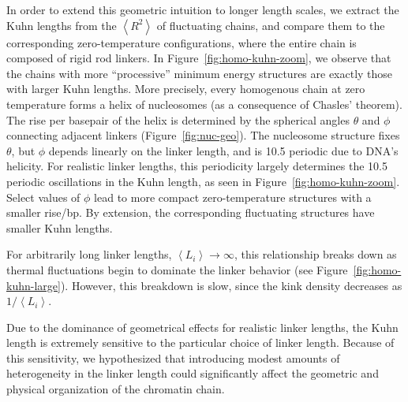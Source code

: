 \documentclass[%
 reprint,
superscriptaddress,
showpacs,preprintnumbers,
 amsmath,amssymb,
 aps,
 prl,
]{revtex4-1}
\newcommand{\RR}{\left\langle{}R^2\right\rangle{}}
\newcommand{\meanli}{\left\langle{}L_i\right\rangle}
\begin{document}
In order to extend this geometric intuition to longer length scales, we extract
the Kuhn lengths from the $\RR$ of fluctuating chains, and compare them to
    the corresponding  zero-temperature configurations, where the entire chain is
    composed of rigid rod linkers.
In Figure~\ref{fig:homo-kuhn-zoom},%
we observe that the chains with more ``processive'' minimum energy structures
    are exactly those with larger Kuhn lengths.
More precisely, every homogenous chain at zero temperature forms a
    helix of nucleosomes (as a consequence of Chasles' theorem).
The rise per basepair of the helix is determined by the spherical angles
    $\theta$ and $\phi$ connecting adjacent linkers (Figure~\ref{fig:nuc-geo}).
The nucleosome structure fixes $\theta$, but $\phi$ depends linearly on the
    linker length, and is \SI{10.5}{\basepair} periodic due to DNA's helicity.
For realistic linker lengths, this periodicity largely determines the
\SI{10.5}{\basepair} periodic oscillations in the Kuhn
length, as seen in Figure~\ref{fig:homo-kuhn-zoom}.
Select values of $\phi$ lead to more compact zero-temperature structures with a
smaller rise/bp. By extension, the corresponding fluctuating structures have smaller Kuhn
lengths.

For arbitrarily long linker lengths, $\meanli\to\infty$, this relationship breaks
    down as thermal fluctuations begin to dominate the linker behavior (see
    Figure~\ref{fig:homo-kuhn-large}).
However, this breakdown is slow, since the kink density decreases as $1/\meanli$.

Due to the dominance of geometrical effects for realistic linker lengths, the
Kuhn length is extremely  sensitive to the particular choice of linker length.
Because of this sensitivity, we hypothesized that introducing modest amounts of
    heterogeneity in the linker length could significantly affect the geometric
    and physical organization of the chromatin chain.
\end{document}
